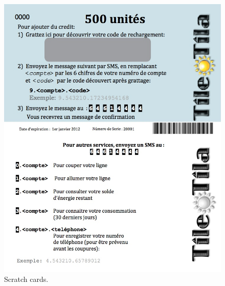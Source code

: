\documentclass[conference]{IEEEtran}
\begin{document}
\begin{figure}[]
\begin{center}
\includegraphics[width=\columnwidth]{figures/scratchCards.jpg}
\end{center}
\caption{Scratch cards.}
\label{scratchCards}
\end{figure}






\end{document}
